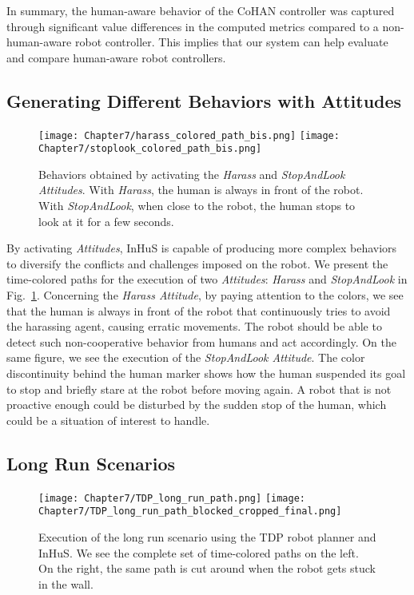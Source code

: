 In summary, the human-aware behavior of the CoHAN controller was captured through significant value differences in the computed metrics compared to a non-human-aware robot controller. This implies that our system can help evaluate and compare human-aware robot controllers.

\subsection{Generating Different Behaviors with Attitudes}

\begin{figure}[h]
    \centering
    \texttt{[image: Chapter7/harass\_colored\_path\_bis.png]}
    \texttt{[image: Chapter7/stoplook\_colored\_path\_bis.png]}
    \caption{
    Behaviors obtained by activating the \textit{Harass} and \textit{StopAndLook Attitudes}. 
    With \textit{Harass}, the human is always in front of the robot.
    With \textit{StopAndLook}, when close to the robot, the human stops to look at it for a few seconds.
    }
    \label{fig:attitudes}
\end{figure}

By activating \textit{Attitudes}, InHuS is capable of producing more complex behaviors to diversify the conflicts and challenges imposed on the robot.
We present the time-colored paths for the execution of two \textit{Attitudes}: \textit{Harass} and \textit{StopAndLook} in Fig.~\ref{fig:attitudes}. Concerning the \textit{Harass Attitude}, by paying attention to the colors, we see that the human is always in front of the robot that continuously tries to avoid the harassing agent, causing erratic movements. The robot should be able to detect such non-cooperative behavior from humans and act accordingly.
On the same figure, we see the execution of the \textit{StopAndLook Attitude}. The color discontinuity behind the human marker shows how the human suspended its goal to stop and briefly stare at the robot before moving again. A robot that is not proactive enough could be disturbed by the sudden stop of the human, which could be a situation of interest to handle. 


\subsection{Long Run Scenarios}


\begin{figure}[h]
    \centering
    \texttt{[image: Chapter7/TDP\_long\_run\_path.png]}
    \texttt{[image: Chapter7/TDP\_long\_run\_path\_blocked\_cropped\_final.png]}
    \caption{Execution of the long run scenario using the TDP robot planner and InHuS. We see the complete set of time-colored paths on the left. On the right, the same path is cut around when the robot gets stuck in the wall. 
    }
    \label{fig:long_run_block}
\end{figure}


